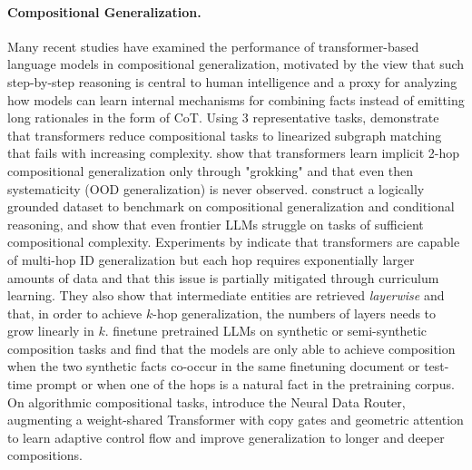 \paragraph{Compositional Generalization.} Many recent studies have examined the performance of transformer-based language models in compositional generalization, motivated by the view that such step-by-step reasoning is central to human intelligence \citep{Simon1971HumanPS} and a proxy for analyzing how models can learn internal mechanisms for combining facts instead of emitting long rationales in the form of CoT. Using 3 representative tasks, \citet{10.5555/3666122.3669203} demonstrate that transformers reduce compositional tasks to linearized subgraph matching that fails with increasing complexity. \citet{10.5555/3737916.3740933} show that transformers learn implicit 2-hop compositional generalization only through "grokking" and that even then systematicity (OOD generalization) is never observed. \cite{kohli-etal-2025-groundcocoa} construct a logically grounded dataset to benchmark on compositional generalization and conditional reasoning, and show that even frontier LLMs struggle on tasks of sufficient compositional complexity. Experiments by \citet{yao-etal-2025-language-models} indicate that transformers are capable of multi-hop ID generalization but each hop requires exponentially larger amounts of data and that this issue is partially mitigated through curriculum learning. They also show that intermediate entities are retrieved \textit{layerwise} and that, in order to achieve $k$-hop generalization, the numbers of layers needs to grow linearly in $k$. \citet{balesni2024two} finetune pretrained LLMs on synthetic or semi-synthetic composition tasks and find that the models are only able to achieve composition when the two synthetic facts co-occur in the same finetuning document or test-time prompt or when one of the hops is a natural fact in the pretraining corpus. On algorithmic compositional tasks, \citet{csordas2022neural} introduce the Neural Data Router, augmenting a weight-shared Transformer with copy gates and geometric attention to learn adaptive control flow and improve generalization to longer and deeper compositions.



